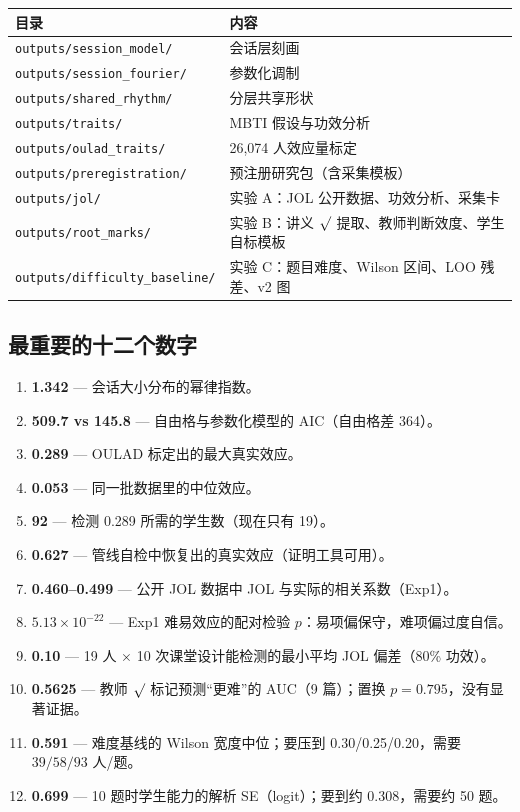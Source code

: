 \documentclass[UTF8,a4paper,11pt]{ctexart}
\begin{document}
\begin{longtable}{@{}p{8.4cm}p{6.0cm}@{}}
\toprule
\textbf{目录} & \textbf{内容} \\
\midrule
\texttt{outputs/session\_model/} & 会话层刻画 \\
\texttt{outputs/session\_fourier/} & 参数化调制 \\
\texttt{outputs/shared\_rhythm/} & 分层共享形状 \\
\texttt{outputs/traits/} & MBTI 假设与功效分析 \\
\texttt{outputs/oulad\_traits/} & 26,074 人效应量标定 \\
\texttt{outputs/preregistration/} & 预注册研究包（含采集模板） \\
\texttt{outputs/jol/} & 实验 A：JOL 公开数据、功效分析、采集卡 \\
\texttt{outputs/root\_marks/} & 实验 B：讲义 $\surd$ 提取、教师判断效度、学生自标模板 \\
\texttt{outputs/difficulty\_baseline/} & 实验 C：题目难度、Wilson 区间、LOO 残差、v2 图 \\
\bottomrule
\end{longtable}

\subsection{最重要的十二个数字}

\begin{enumerate}[leftmargin=2em]
\item \textbf{1.342} --- 会话大小分布的幂律指数。
\item \textbf{509.7 vs 145.8} --- 自由格与参数化模型的 AIC（自由格差 364）。
\item \textbf{0.289} --- OULAD 标定出的最大真实效应。
\item \textbf{0.053} --- 同一批数据里的中位效应。
\item \textbf{92} --- 检测 0.289 所需的学生数（现在只有 19）。
\item \textbf{0.627} --- 管线自检中恢复出的真实效应（证明工具可用）。
\item \textbf{0.460--0.499} --- 公开 JOL 数据中 JOL 与实际的相关系数（Exp1）。
\item \textbf{$5.13\times10^{-22}$} --- Exp1 难易效应的配对检验 $p$：易项偏保守，难项偏过度自信。
\item \textbf{0.10} --- 19 人 $\times$ 10 次课堂设计能检测的最小平均 JOL 偏差（80\% 功效）。
\item \textbf{0.5625} --- 教师 $\surd$ 标记预测“更难”的 AUC（9 篇）；置换 $p=0.795$，没有显著证据。
\item \textbf{0.591} --- 难度基线的 Wilson 宽度中位；要压到 0.30/0.25/0.20，需要 $39/58/93$ 人/题。
\item \textbf{0.699} --- 10 题时学生能力的解析 SE（logit）；要到约 0.308，需要约 50 题。
\end{enumerate}
\end{document}
